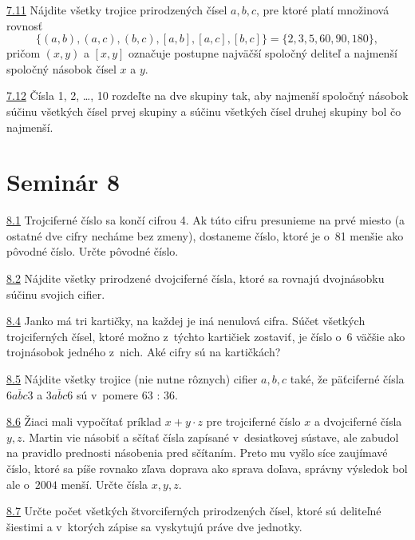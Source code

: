 \noindent \ul{7.11} 
Nájdite všetky trojice prirodzených čísel $a, b, c$, pre ktoré platí množinová rovnosť
$$\{(a, b), (a, c), (b, c), [a, b], [a, c], [b, c]\}= \{2, 3, 5, 60, 90, 180\},$$
pričom $(x, y)$ a $[x, y]$ označuje postupne najväčší spoločný deliteľ a najmenší spoločný násobok čísel $x$ a $y$.




\noindent \ul{7.12} 
Čísla 1, 2, \ldots , 10 rozdeľte na dve skupiny tak, aby najmenší spoločný násobok súčinu všetkých čísel prvej skupiny a súčinu všetkých čísel druhej skupiny bol čo najmenší.




\section*{Seminár 8}

\noindent \ul{8.1}  Trojciferné číslo sa končí cifrou 4. Ak túto cifru presunieme na prvé miesto (a ostatné dve cifry necháme bez zmeny), dostaneme číslo, ktoré je o~81 menšie ako pôvodné číslo. Určte pôvodné číslo.




\noindent \ul{8.2}  Nájdite všetky prirodzené dvojciferné čísla, ktoré sa rovnajú dvojnásobku súčinu svojich cifier.




\noindent \ul{8.4}  Janko má tri kartičky, na každej je iná nenulová cifra. Súčet všetkých trojciferných čísel, ktoré možno z~týchto kartičiek zostaviť, je číslo o~6 väčšie ako trojnásobok jedného z~nich. Aké cifry sú na kartičkách?




\noindent \ul{8.5} 
Nájdite všetky trojice (nie nutne rôznych) cifier $a, b, c$ také, že päťciferné čísla $\overline{6abc3}$ a $\overline{3abc6}$ sú v~pomere 63 : 36.




\noindent \ul{8.6}   Žiaci mali vypočítať príklad $x + y \cdot z$ pre trojciferné číslo $x$ a dvojciferné čísla $y, z$. Martin vie násobiť a sčítať čísla zapísané v~desiatkovej sústave, ale zabudol na pravidlo prednosti násobenia pred sčítaním. Preto mu vyšlo síce zaujímavé číslo, ktoré sa píše rovnako zľava doprava ako sprava doľava, správny výsledok bol ale o~$2 004$ menší. Určte čísla $x, y, z$.




\noindent \ul{8.7}  Určte počet všetkých štvorciferných prirodzených čísel, ktoré sú deliteľné šiestimi a v~ktorých zápise sa vyskytujú práve dve jednotky.




